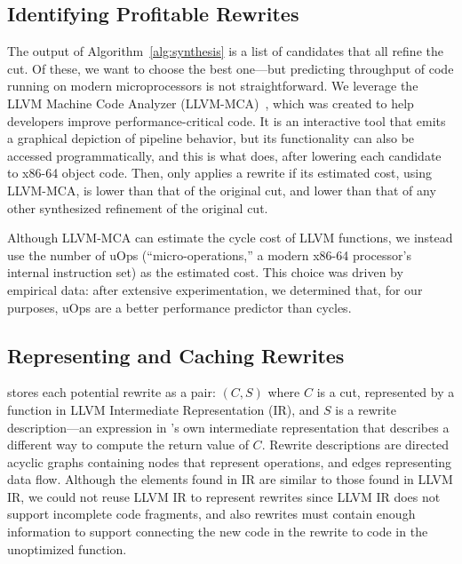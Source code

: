 \subsection{Identifying Profitable Rewrites}

The output of Algorithm~\ref{alg:synthesis} is a list of candidates
that all refine the cut.
%
Of these, we want to choose the best one---but predicting throughput
of code running on modern microprocessors is not straightforward.
%
We leverage the LLVM Machine Code Analyzer (LLVM-MCA)~\cite{llvmmca},
which was created to help developers improve performance-critical
code.
%
It is an interactive tool that emits a graphical depiction of pipeline
behavior, but its functionality can also be accessed programmatically,
and this is what \minotaur{} does, after lowering each candidate to
x86-64 object code.
%
Then, \minotaur{} only applies a rewrite if its estimated cost, using
LLVM-MCA, is lower than that of the original cut, and lower than
that of any other synthesized refinement of the original cut.


Although LLVM-MCA can estimate the cycle cost of LLVM functions, we
instead use the number of uOps (``micro-operations,'' a modern x86-64
processor's internal instruction set) as the estimated cost.
%
This choice was driven by empirical data: after extensive
experimentation, we determined that, for our purposes, uOps are a
better performance predictor than cycles.



\subsection{Representing and Caching Rewrites}
\label{sec:rewrite}

\minotaur{} stores each potential rewrite as a pair: $(C, S)$
where $C$ is a cut, represented by a function in LLVM
Intermediate Representation (IR), and $S$ is a rewrite description---an
expression in \minotaur's own intermediate representation that describes a
different way to compute the return value of $C$.
%
Rewrite descriptions are directed acyclic graphs containing nodes that represent
operations, and edges representing data flow.
%
Although the elements found in \minotaur{} IR are similar to those found
in LLVM IR, we could not reuse LLVM IR to represent rewrites since
LLVM IR does not support incomplete code fragments, and also rewrites
must contain enough information to support connecting the new code in
the rewrite to code in the unoptimized function.


